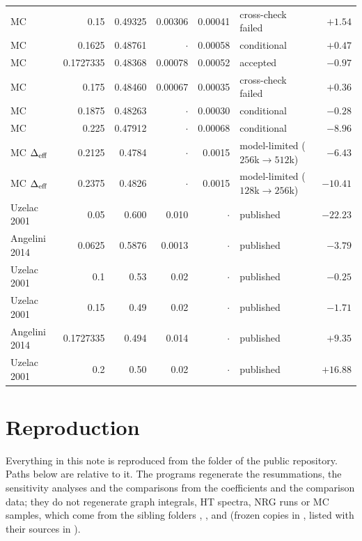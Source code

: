 {\begin{longtable}{@{}l r r r r l r@{}}
MC & 0.15 & 0.49325 & 0.00306 & 0.00041 & cross-check failed & $+1.54$\\
MC & 0.1625 & 0.48761 & $\cdot$ & 0.00058 & conditional & $+0.47$\\
MC & 0.1727335 & 0.48368 & 0.00078 & 0.00052 & accepted & $-0.97$\\
MC & 0.175 & 0.48460 & 0.00067 & 0.00035 & cross-check failed & $+0.36$\\
MC & 0.1875 & 0.48263 & $\cdot$ & 0.00030 & conditional & $-0.28$\\
MC & 0.225 & 0.47912 & $\cdot$ & 0.00068 & conditional & $-8.96$\\
MC $\Delta_{\rm eff}$ & 0.2125 & 0.4784 & $\cdot$ & 0.0015 & model-limited ($256$k$\to512$k) & $-6.43$\\
MC $\Delta_{\rm eff}$ & 0.2375 & 0.4826 & $\cdot$ & 0.0015 & model-limited ($128$k$\to256$k) & $-10.41$\\
Uzelac 2001 & 0.05 & 0.600 & 0.010 & $\cdot$ & published & $-22.23$\\
Angelini 2014 & 0.0625 & 0.5876 & 0.0013 & $\cdot$ & published & $-3.79$\\
Uzelac 2001 & 0.1 & 0.53 & 0.02 & $\cdot$ & published & $-0.25$\\
Uzelac 2001 & 0.15 & 0.49 & 0.02 & $\cdot$ & published & $-1.71$\\
Angelini 2014 & 0.1727335 & 0.494 & 0.014 & $\cdot$ & published & $+9.35$\\
Uzelac 2001 & 0.2 & 0.50 & 0.02 & $\cdot$ & published & $+16.88$\\
\end{longtable}}

\section{Reproduction}\label{rs:app:repro}
Everything in this note is reproduced from the folder  of the public
repository. Paths below are relative to it. The programs regenerate the resummations, the
sensitivity analyses and the comparisons from the coefficients and the comparison data; they do
not regenerate graph integrals, HT spectra, NRG runs or MC samples, which come from the sibling
folders , ,  and  (frozen copies in
, listed with their sources in ).

